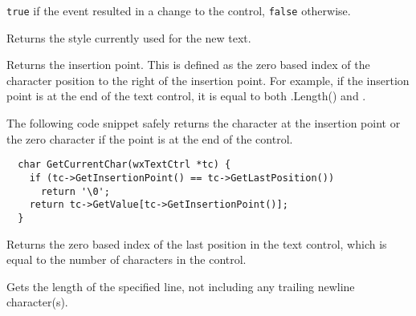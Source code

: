 {\tt true} if the event resulted in a change to the control, {\tt false}
otherwise.


\label{wxtextctrlgetdefaultstyle}


Returns the style currently used for the new text.




\label{wxtextctrlgetinsertionpoint}


Returns the insertion point. This is defined as the zero based index of the
character position to the right of the insertion point. For example, if
the insertion point is at the end of the text control, it is equal to
both .Length() and
.

The following code snippet safely returns the character at the insertion
point or the zero character if the point is at the end of the control.

{\small%
\begin{verbatim}
  char GetCurrentChar(wxTextCtrl *tc) {
    if (tc->GetInsertionPoint() == tc->GetLastPosition())
      return '\0';
    return tc->GetValue[tc->GetInsertionPoint()];
  }
\end{verbatim}
}%


\label{wxtextctrlgetlastposition}


Returns the zero based index of the last position in the text control,
which is equal to the number of characters in the control.


\label{wxtextctrlgetlinelength}


Gets the length of the specified line, not including any trailing newline
character(s).




